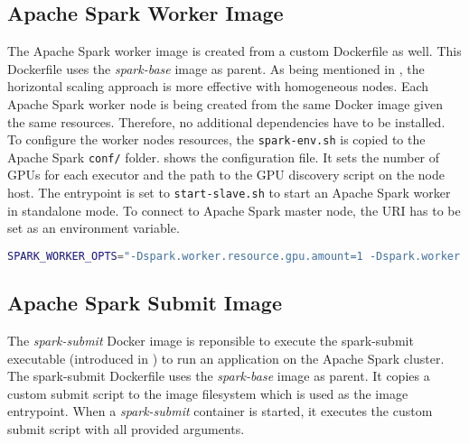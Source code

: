 \subsection{Apache Spark Worker Image}
The Apache Spark worker image is created from a custom Dockerfile as well.
%
This Dockerfile uses the \textit{spark-base} image as parent.
As being mentioned in , the horizontal scaling approach is more effective with homogeneous nodes. Each Apache Spark worker node is being created from the same Docker image given the same resources.
%
Therefore, no additional dependencies have to be installed.
%
To configure the worker nodes resources, the \texttt{spark-env.sh} is copied to the Apache Spark \texttt{conf/} folder.  shows the configuration file. It sets the number of GPUs for each executor and the path to the GPU discovery script on the node host.
%
The entrypoint is set to \texttt{start-slave.sh} to start an Apache Spark worker in standalone mode. To connect to Apache Spark master node, the URI has to be set as an environment variable.
\begin{lstlisting}[label=lst:06_env_depl_worker-env, caption=Environment configuration for all worker nodes, language=sh, numbers=none]
SPARK_WORKER_OPTS="-Dspark.worker.resource.gpu.amount=1 -Dspark.worker.resource.gpu.discoveryScript=/opt/sparkRapidsPlugin/getGpusResources.sh"
\end{lstlisting}


\subsection{Apache Spark Submit Image}
The \textit{spark-submit} Docker image is reponsible to execute the spark-submit executable (introduced in ) to run an application on the Apache Spark cluster.
The spark-submit Dockerfile uses the \textit{spark-base} image as parent.
It copies a custom submit script to the image filesystem which is used as the image entrypoint. When a \textit{spark-submit} container is started, it executes the custom submit script with all provided arguments.


